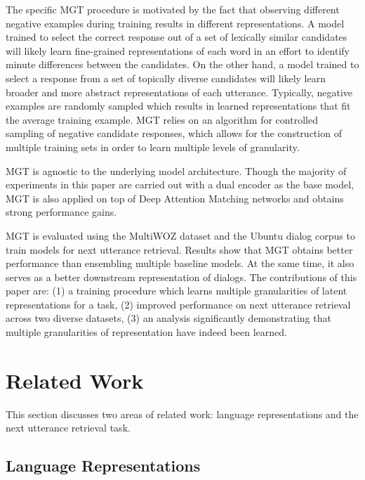 \documentclass[11pt,a4paper]{article}
\begin{document}
The specific MGT procedure is motivated by the fact that observing different negative examples during training results in different representations. A model trained to select the correct response out of a set of lexically similar candidates will likely learn fine-grained representations of each word in an effort to identify minute differences between the candidates. On the other hand, a model trained to select a response from a set of topically diverse candidates will likely learn broader and more abstract representations of each utterance. Typically, negative examples are randomly sampled which results in learned representations that fit the average training example. MGT relies on an algorithm for controlled sampling of negative candidate responses, which allows for the construction of multiple training sets in order to learn multiple levels of granularity. 

MGT is agnostic to the underlying model architecture. Though the majority of experiments in this paper are carried out with a dual encoder \citep{lowe2015ubuntu} as the base model, MGT is also applied on top of Deep Attention Matching networks \citep{zhou2018multi} and obtains strong performance gains.

MGT is evaluated using the MultiWOZ dataset \citep{budzianowski2018multiwoz} and the Ubuntu dialog corpus \citep{lowe2015ubuntu} to train models for next utterance retrieval. Results show that MGT obtains better performance than ensembling \citep{perrone1992networks} multiple baseline models. At the same time, it also serves as a better downstream representation of dialogs. The contributions of this paper are: (1) a training procedure which learns multiple granularities of latent representations for a task, (2) improved performance on next utterance retrieval across two diverse datasets, (3) an analysis significantly demonstrating that multiple granularities of representation have indeed been learned.

\section{Related Work}

This section discusses two areas of related work: language representations and the next utterance retrieval task.  

\subsection{Language Representations}
\end{document}
